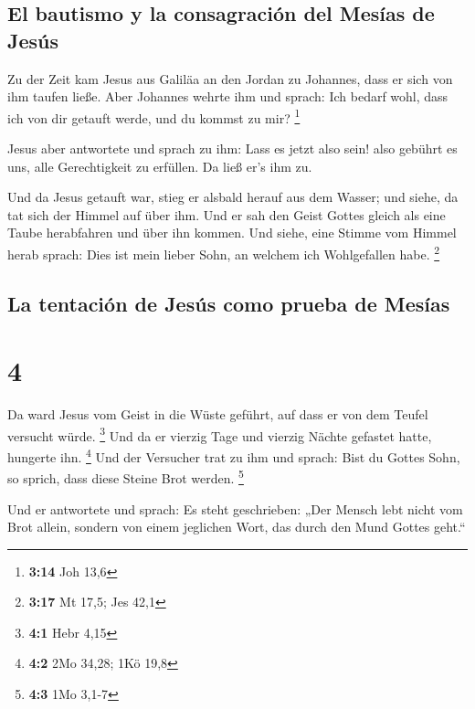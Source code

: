 \hypertarget{el-bautismo-y-la-consagraciuxf3n-del-mesuxedas-de-jesuxfas}{%
\subsection{El bautismo y la consagración del Mesías de
Jesús}\label{el-bautismo-y-la-consagraciuxf3n-del-mesuxedas-de-jesuxfas}}

 Zu der Zeit kam Jesus aus Galiläa an den Jordan zu
Johannes, dass er sich von ihm taufen ließe.  Aber
Johannes wehrte ihm und sprach: Ich bedarf wohl, dass ich von dir
getauft werde, und du kommst zu mir? \footnote{\textbf{3:14} Joh 13,6}

 Jesus aber antwortete und sprach zu ihm: Lass es jetzt
also sein! also gebührt es uns, alle Gerechtigkeit zu erfüllen. Da ließ
er's ihm zu.

 Und da Jesus getauft war, stieg er alsbald herauf aus
dem Wasser; und siehe, da tat sich der Himmel auf über ihm. Und er sah
den Geist Gottes gleich als eine Taube herabfahren und über ihn kommen.
 Und siehe, eine Stimme vom Himmel herab sprach: Dies ist
mein lieber Sohn, an welchem ich Wohlgefallen habe. \footnote{\textbf{3:17}
  Mt 17,5; Jes 42,1}

\hypertarget{la-tentaciuxf3n-de-jesuxfas-como-prueba-de-mesuxedas}{%
\subsection{La tentación de Jesús como prueba de
Mesías}\label{la-tentaciuxf3n-de-jesuxfas-como-prueba-de-mesuxedas}}

\hypertarget{section-3}{%
\section{4}\label{section-3}}

 Da ward Jesus vom Geist in die Wüste geführt, auf dass er
von dem Teufel versucht würde. \footnote{\textbf{4:1} Hebr 4,15}
 Und da er vierzig Tage und vierzig Nächte gefastet hatte,
hungerte ihn. \footnote{\textbf{4:2} 2Mo 34,28; 1Kö 19,8} 
Und der Versucher trat zu ihm und sprach: Bist du Gottes Sohn, so
sprich, dass diese Steine Brot werden. \footnote{\textbf{4:3} 1Mo 3,1-7}

 Und er antwortete und sprach: Es steht geschrieben: „Der
Mensch lebt nicht vom Brot allein, sondern von einem jeglichen Wort, das
durch den Mund Gottes geht.``

